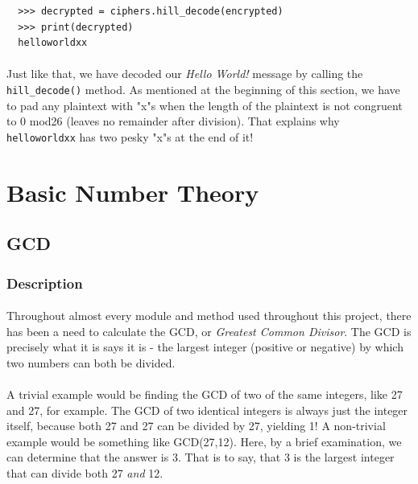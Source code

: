 \documentclass[12pt,a4paper]{article}
\begin{document}
\begin{verbatim}
  >>> decrypted = ciphers.hill_decode(encrypted)
  >>> print(decrypted)
  helloworldxx
\end{verbatim}

\paragraph{}
Just like that, we have decoded our \textit{Hello World!} message by 
calling the \verb|hill_decode()| method.  As mentioned at the beginning of 
this section, we have to pad any plaintext with "x"s when the length of the 
plaintext is not congruent to 0 mod26 (leaves no remainder after division).  
That explains why \verb|helloworldxx| has two pesky "x"s at the end of it!


\section{Basic Number Theory}


\subsection{GCD}
\subsubsection{Description}
\paragraph{}
Throughout almost every module and method used throughout this project, there 
has been a need to calculate the GCD, or \textit{Greatest Common Divisor}.  The 
GCD is precisely what it is says it is - the largest integer (positive or 
negative) by which two numbers can both be divided.

\paragraph{}
A trivial example would be finding the GCD of two of the same integers, like 
27 and 27, for example.  The GCD of two identical integers is always just the 
integer itself, because both 27 and 27 can be divided by 27, yielding 1!  A 
non-trivial example would be something like GCD(27,12).  Here, by a brief 
examination, we can determine that the answer is 3.  That is to say, that 3 is 
the largest integer that can divide both 27 \textit{and} 12.
\end{document}
